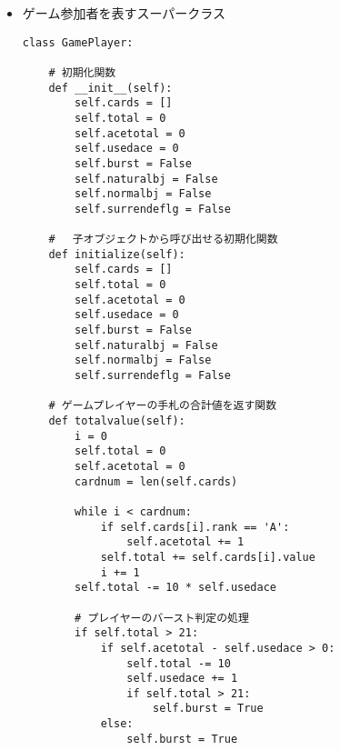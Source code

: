 \begin{itemize}
\item ゲーム参加者を表すスーパークラス
\begin{lstlisting}
class GamePlayer:

    # 初期化関数
    def __init__(self):
        self.cards = []
        self.total = 0
        self.acetotal = 0
        self.usedace = 0
        self.burst = False
        self.naturalbj = False
        self.normalbj = False
        self.surrendeflg = False

    # 　子オブジェクトから呼び出せる初期化関数
    def initialize(self):
        self.cards = []
        self.total = 0
        self.acetotal = 0
        self.usedace = 0
        self.burst = False
        self.naturalbj = False
        self.normalbj = False
        self.surrendeflg = False

    # ゲームプレイヤーの手札の合計値を返す関数
    def totalvalue(self):
        i = 0
        self.total = 0
        self.acetotal = 0
        cardnum = len(self.cards)

        while i < cardnum:
            if self.cards[i].rank == 'A':
                self.acetotal += 1
            self.total += self.cards[i].value
            i += 1
        self.total -= 10 * self.usedace

        # プレイヤーのバースト判定の処理
        if self.total > 21:
            if self.acetotal - self.usedace > 0:
                self.total -= 10
                self.usedace += 1
                if self.total > 21:
                    self.burst = True
            else:
                self.burst = True

\end{lstlisting}
\end{itemize}